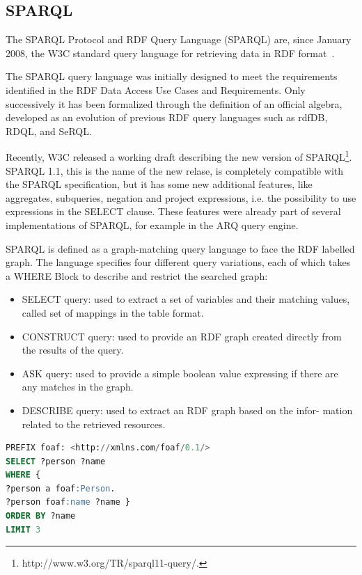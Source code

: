 \subsection{SPARQL}\label{sec:sparql}

The SPARQL Protocol and RDF Query Language (SPARQL) are, since January 2008, the W3C standard query language for retrieving data in RDF format~\cite{prudhommeaux_sparql_2008}.

The SPARQL query language was initially designed to meet the requirements identified in the RDF Data Access Use Cases and Requirements. Only successively it has been formalized through the definition of an official algebra, developed as an evolution of previous RDF query languages such as rdfDB, RDQL, and SeRQL.

Recently, W3C released a working draft describing the new version of SPARQL\footnote{http://www.w3.org/TR/sparql11-query/.}. SPARQL 1.1, this is the name of the new relase, is completely compatible with the SPARQL specification, but it has some new additional features, like aggregates, subqueries, negation and project expressions, i.e. the possibility to use expressions in the SELECT clause. These features were already part of several implementations of SPARQL, for example in the ARQ query engine. 

SPARQL is defined as a graph-matching query language to face the RDF labelled graph. The language specifies four different query variations, each of which takes a WHERE Block to describe and restrict the searched graph:
\begin{itemize}
\item SELECT query: used to extract a set of variables and their matching values, called set of mappings in the table format.
\item CONSTRUCT query: used to provide an RDF graph created directly from the results of the query.
\item ASK query: used to provide a simple boolean value expressing if there are any matches in the graph.
\item DESCRIBE query: used to extract an RDF graph based on the infor- mation related to the retrieved resources.
\end{itemize}

\begin{lstlisting}[language=SQL, caption=An example of a simple SPARQL query , keywords={PREFIX,SELECT,WHERE,ORDER,BY, LIMIT }, label=code:sparql]
PREFIX foaf: <http://xmlns.com/foaf/0.1/> 
SELECT ?person ?name
WHERE {
?person a foaf:Person.
?person foaf:name ?name }
ORDER BY ?name 
LIMIT 3
\end{lstlisting}

